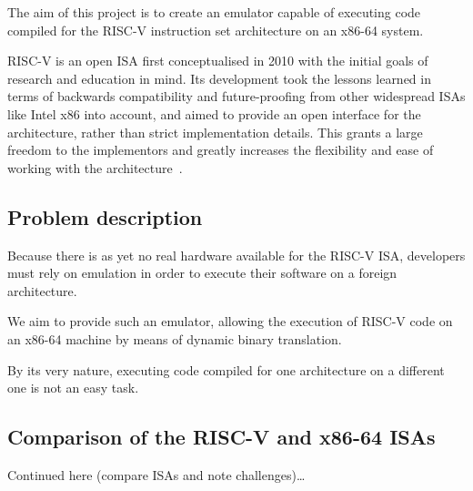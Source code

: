 The aim of this project is to create an emulator capable of executing code compiled for the RISC-V instruction set architecture on an x86-64 system.

RISC-V is an open ISA first conceptualised in 2010 with the initial goals of research and education in mind.
Its development took the lessons learned in terms of backwards compatibility and future-proofing from other widespread ISAs like Intel x86 into account, and aimed to provide an open interface for the architecture, rather than strict implementation details.
This grants a large freedom to the implementors and greatly increases the flexibility and ease of working with the architecture~\cite[S. 1f]{riscvspec}.

\subsection{Problem description}
Because there is as yet no real hardware available for the RISC-V ISA, developers must rely on emulation in order to execute their software on a foreign architecture.

We aim to provide such an emulator, allowing the execution of RISC-V code on an x86-64 machine by means of dynamic binary translation.

By its very nature, executing code compiled for one architecture on a different one is not an easy task.


\subsection{Comparison of the RISC-V and x86-64 ISAs}
\label{sec:isa-cmp}
Continued here (compare ISAs and note challenges)\ldots














